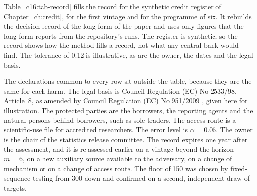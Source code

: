 Table~\ref{c16:tab-record} fills the record for the synthetic credit register of
Chapter~\ref{ch:credit}, for the first vintage and for the programme of six. It
rebuilds the decision record of the long form of the paper and uses only figures that
the long form reports from the repository's runs.
The register is synthetic, so the record shows how the method fills a record, not
what any central bank would find. The tolerance of 0.12 is illustrative, as are the
owner, the dates and the legal basis.

The declarations common to every row sit outside the table, because they are the
same for each harm. The legal basis is Council Regulation (EC) No 2533/98,
Article~8, as amended by Council Regulation (EC) No 951/2009 \citep{ec2533,ec951},
given here for illustration. The protected parties are the borrowers, the reporting
agents and the natural persons behind borrowers, such as sole traders. The access
route is a scientific-use file for accredited researchers. The error level is
$\alpha = 0.05$. The owner is the chair of the statistics release committee. The
record expires one year after the assessment, and it is re-assessed earlier on a
vintage beyond the horizon $m = 6$, on a new auxiliary source available to the
adversary, on a change of mechanism or on a change of access route. The floor of 150
was chosen by fixed-sequence testing from 300 down and confirmed on a second,
independent draw of targets.

\syntheticnote


